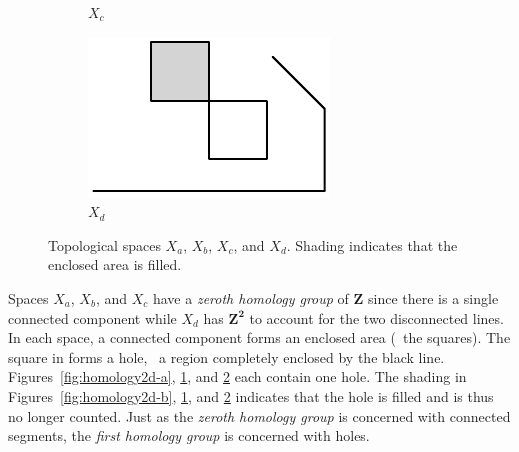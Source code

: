 \begin{figure}[h]
\begin{subfigure}[b]{0.2\textwidth}
		\caption{$X_c$} \label{fig:homology2d-c}
	\end{subfigure} \qquad
	\begin{subfigure}[b]{0.2\textwidth}
		\includegraphics[width=\textwidth]{Figs/homology2d-d.pdf}
		\caption{$X_d$} \label{fig:homology2d-d}
	\end{subfigure}
	\caption{Topological spaces $X_a$, $X_b$, $X_c$, and $X_d$. Shading indicates that the enclosed area is filled.} \label{fig:homology2d}
\end{figure}

Spaces $X_a$, $X_b$, and $X_c$ have a \textit{zeroth homology group} of $\mathbf{Z}$ since there is a single connected component while $X_d$ has $\mathbf{Z^2}$ to account for the two disconnected lines. In each space, a connected component forms an enclosed area (\ie~the squares). The square in  forms a hole, \ie~a region completely enclosed by the black line. Figures~\ref{fig:homology2d-a}, \ref{fig:homology2d-c}, and \ref{fig:homology2d-d} each contain one hole. The shading in Figures~\ref{fig:homology2d-b}, \ref{fig:homology2d-c}, and \ref{fig:homology2d-d} indicates that the hole is filled and is thus no longer counted. Just as the \textit{zeroth homology group} is concerned with connected segments, the \textit{first homology group} is concerned with holes.

